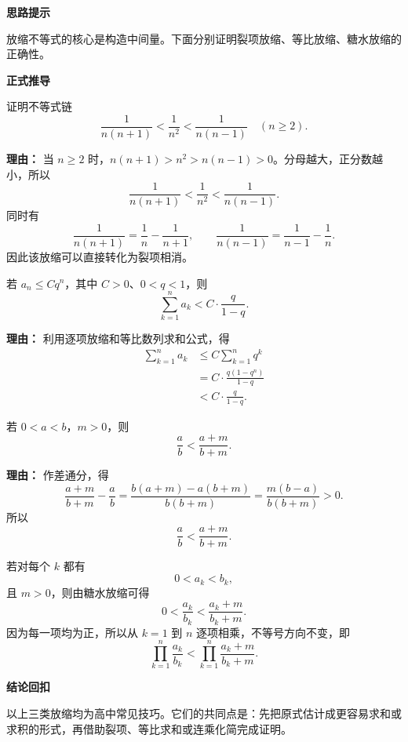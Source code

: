 \begin{proofbox}
	\textbf{\textcolor{CProof}{思路提示}}

	放缩不等式的核心是构造中间量。下面分别证明裂项放缩、等比放缩、糖水放缩的正确性。

	\medskip
	\textbf{\textcolor{CProof}{正式推导}}
	\begin{description}[style=nextline, leftmargin=2.8em, labelsep=0.5em, itemsep=0.55em]
		\item[\textbf{步骤一（裂项放缩证明）：}]
		      证明不等式链
		      \[
			      \frac{1}{n(n+1)}<\frac{1}{n^2}<\frac{1}{n(n-1)}\quad(n\ge2).
		      \]
		      \par\textbf{理由：} 当 $n\ge2$ 时，$n(n+1)>n^2>n(n-1)>0$。分母越大，正分数越小，所以
		      \[
			      \frac{1}{n(n+1)}<\frac{1}{n^2}<\frac{1}{n(n-1)}.
		      \]
		      同时有
		      \[
			      \frac{1}{n(n+1)}=\frac1n-\frac1{n+1},
			      \qquad
			      \frac{1}{n(n-1)}=\frac1{n-1}-\frac1n.
		      \]
		      因此该放缩可以直接转化为裂项相消。

		\item[\textbf{步骤二（等比放缩原理）：}]
		      若 $a_n\le Cq^n$，其中 $C>0$、$0<q<1$，则
		      \[
			      \sum_{k=1}^n a_k<C\cdot\frac{q}{1-q}.
		      \]
		      \par\textbf{理由：} 利用逐项放缩和等比数列求和公式，得
		      \[
			      \begin{aligned}
				      \sum_{k=1}^n a_k
				       & \le C\sum_{k=1}^n q^k       \\[2pt]
				       & =C\cdot\frac{q(1-q^n)}{1-q} \\[2pt]
				       & <C\cdot\frac{q}{1-q}.
			      \end{aligned}
		      \]

		\item[\textbf{步骤三（糖水放缩证明）：}]
		      若 $0<a<b$，$m>0$，则
		      \[
			      \frac{a}{b}<\frac{a+m}{b+m}.
		      \]
		      \par\textbf{理由：} 作差通分，得
		      \[
			      \frac{a+m}{b+m}-\frac{a}{b}
			      =\frac{b(a+m)-a(b+m)}{b(b+m)}
			      =\frac{m(b-a)}{b(b+m)}>0.
		      \]
		      所以
		      \[
			      \frac{a}{b}<\frac{a+m}{b+m}.
		      \]

		\item[\textbf{步骤四（连乘放缩说明）：}]
		      若对每个 $k$ 都有
		      \[
			      0<a_k<b_k,
		      \]
		      且 $m>0$，则由糖水放缩可得
		      \[
			      0<\frac{a_k}{b_k}<\frac{a_k+m}{b_k+m}.
		      \]
		      因为每一项均为正，所以从 $k=1$ 到 $n$ 逐项相乘，不等号方向不变，即
		      \[
			      \prod_{k=1}^n\frac{a_k}{b_k}
			      <\prod_{k=1}^n\frac{a_k+m}{b_k+m}.
		      \]
	\end{description}

	\medskip
	\textbf{\textcolor{CProof}{结论回扣}}

	以上三类放缩均为高中常见技巧。它们的共同点是：先把原式估计成更容易求和或求积的形式，再借助裂项、等比求和或连乘化简完成证明。
\end{proofbox}
